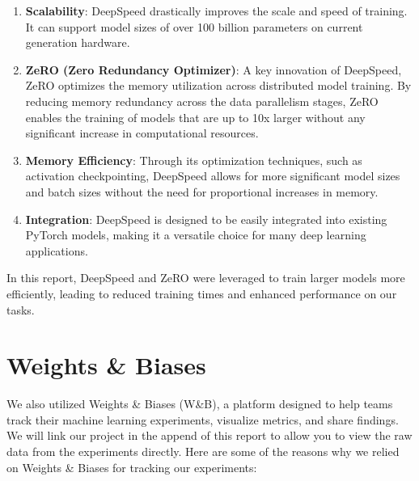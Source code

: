 \documentclass[\main/thesis.tex]{subfiles}
\begin{document}
\begin{enumerate}
    \item \textbf{Scalability}: DeepSpeed drastically improves the scale and speed of training. It can support 
    model sizes of over 100 billion parameters on current generation hardware.
    
    \item \textbf{ZeRO (Zero Redundancy Optimizer)}: A key innovation of DeepSpeed, ZeRO optimizes the memory utilization across 
    distributed model training. By reducing memory redundancy across the data parallelism stages, ZeRO enables the training of models 
    that are up to 10x larger without any significant increase in computational resources.
    
    \item \textbf{Memory Efficiency}: Through its optimization techniques, such as activation checkpointing, 
    DeepSpeed allows for more significant model sizes and batch sizes without the need for proportional increases in memory.
    
    \item \textbf{Integration}: DeepSpeed is designed to be easily integrated into existing PyTorch models, making it a 
    versatile choice for many deep learning applications.
\end{enumerate}

In this report, DeepSpeed and ZeRO were leveraged to train larger models more efficiently, leading to reduced training times and 
enhanced performance on our tasks.

\section{Weights \& Biases}\label{sec:weightsAndBiases}

We also utilized Weights \& Biases (W\&B)\cite{wandb}, a platform designed to help teams track their machine learning experiments, 
visualize metrics, and share findings. We will link our project in the append of this report to allow you to view the raw data from the 
experiments directly. Here are some of the reasons why we relied on Weights \& Biases for tracking our experiments: 
\end{document}
